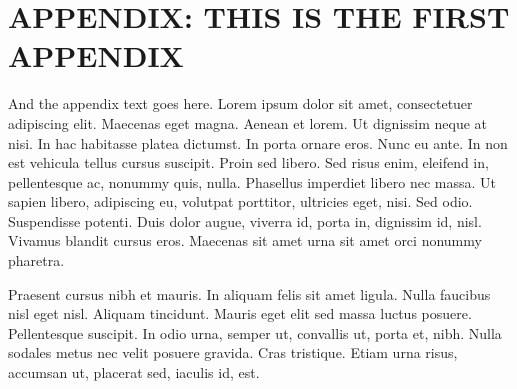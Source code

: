 


\appendix %

\chapter*{APPENDIX: THIS IS THE FIRST APPENDIX} %


\setcounter{chapter}{1} %

And the appendix text goes here. Lorem ipsum dolor sit amet, consectetuer 
adipiscing elit. Maecenas eget magna. Aenean et lorem. Ut dignissim neque 
at nisi. In hac habitasse platea dictumst. In porta ornare eros. Nunc eu ante. 
In non est vehicula tellus cursus suscipit. Proin sed libero. Sed risus
enim, eleifend in, pellentesque ac, nonummy quis, nulla. Phasellus
imperdiet libero nec massa. Ut sapien libero, adipiscing eu,
volutpat porttitor, ultricies eget, nisi. Sed odio. Suspendisse
potenti. Duis dolor augue, viverra id, porta in, dignissim id, nisl.
Vivamus blandit cursus eros. Maecenas sit amet urna sit amet orci
nonummy pharetra.

Praesent cursus nibh et mauris. In aliquam felis sit amet ligula.
Nulla faucibus nisl eget nisl. Aliquam tincidunt. Mauris eget elit
sed massa luctus posuere. Pellentesque suscipit. In odio urna,
semper ut, convallis ut, porta et, nibh. Nulla sodales metus nec
velit posuere gravida. Cras tristique. Etiam urna risus, accumsan
ut, placerat sed, iaculis id, est.

